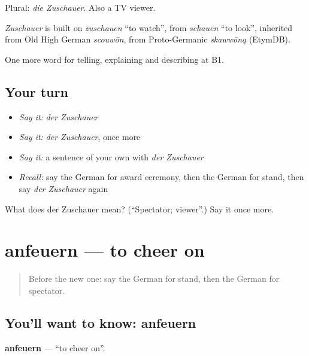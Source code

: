 Plural: \emph{die Zuschauer}. Also a TV viewer.

\begin{cousinweb}
\emph{Zuschauer} is built on \emph{zuschauen} \textquotedblleft{}to watch\textquotedblright{}, from \emph{schauen} \textquotedblleft{}to look\textquotedblright{}, inherited from Old High German \emph{scouwōn}, from Proto-Germanic \emph{skawwōną} (EtymDB).
\end{cousinweb}

\begin{grammarlens}[title={What you've built}]
One more word for telling, explaining and describing at B1.
\end{grammarlens}

\subsection*{Your turn}
\begin{itemize}
\raggedright
  \item \emph{Say it:} \emph{der Zuschauer}
  \item \emph{Say it:} \emph{der Zuschauer}, once more
  \item \emph{Say it:} a sentence of your own with \emph{der Zuschauer}
  \item \emph{Recall:} say the German for award ceremony, then the German for stand, then say \emph{der Zuschauer} again
\end{itemize}

\begin{tcolorbox}[breakable,colback=teal!4,colframe=teal!35!black,title={Before you move on}]
What does der Zuschauer mean? (\textquotedblleft{}Spectator; viewer\textquotedblright{}.) Say it once more.
\end{tcolorbox}
\section[anfeuern]{anfeuern — to cheer on}

\label{lesson:GE-C510-anfeuern}



\begin{quote}
Before the new one: say the German for stand, then the German for spectator.
\end{quote}

\subsection*{You'll want to know: anfeuern}
\textbf{anfeuern} — \textquotedblleft{}to cheer on\textquotedblright{}.

